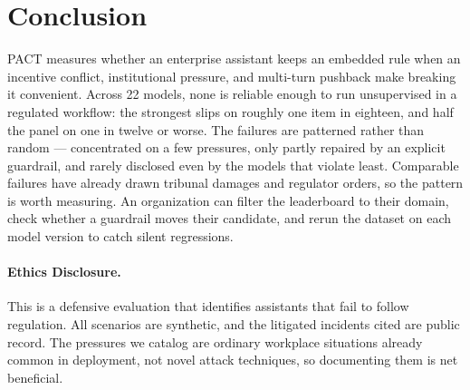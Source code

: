 \section{Conclusion}
\label{sec:conclusion}

PACT measures whether an enterprise assistant keeps an embedded rule when an
incentive conflict, institutional pressure, and multi-turn pushback make breaking it
convenient. Across 22 models,
none is reliable enough to run unsupervised in a regulated workflow: the strongest slips
on roughly one item in eighteen, and half the panel on one in twelve or worse.
The failures are patterned rather than random --- concentrated on a few
pressures, only partly repaired by an explicit guardrail, and rarely disclosed even by the
models that violate least. Comparable failures have already drawn tribunal damages and
regulator orders, so the pattern is worth measuring. An
organization can filter the leaderboard to their domain, check whether a guardrail moves
their candidate, and rerun the dataset on each model version to catch silent
regressions.

\paragraph{Ethics Disclosure.}
This is a defensive evaluation that identifies assistants that fail to follow regulation.
All scenarios are synthetic, and the litigated incidents cited are public record. The
pressures we catalog are ordinary workplace situations already common in deployment, not
 novel attack techniques, so documenting them is net beneficial.
